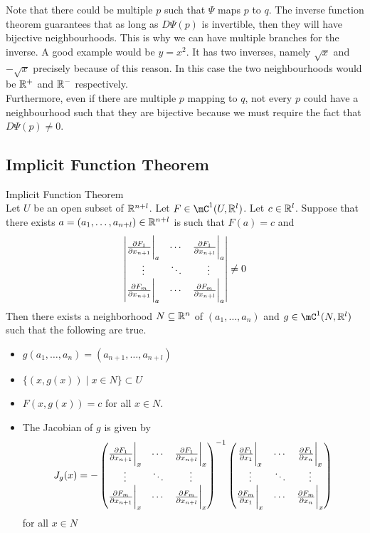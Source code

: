 \documentclass[a4paper]{article}
\begin{document}
Note that there could be multiple $p$ such that $\Psi$ maps $p$ to $q$. The inverse function theorem guarantees that as long as $D\Psi(p)$ is invertible, then they will have bijective neighbourhoods. This is why we can have multiple branches for the inverse. A good example would be $y=x^2$. It has two inverses, namely $\sqrt{x}$ and $-\sqrt{x}$ precisely because of this reason. In this case the two neighbourhoods would be $\mathbb{R}^+$ and $\mathbb{R}^-$ respectively. \\

Furthermore, even if there are multiple $p$ mapping to $q$, not every $p$ could have a neighbourhood such that they are bijective because we must require the fact that $D\Psi(p)\neq 0$. 

\subsection{Implicit Function Theorem}
\begin{thm}{Implicit Function Theorem}{}\\
Let $U$ be an open subset of $\mathbb{R}^{n+l}$. Let $F\in\mC^1(U,\R^l)$. Let $c\in\mathbb{R}^l$. Suppose that there exists $a=(a_1,\dots,a_{n+l})\in\mathbb{R}^{n+l}$ is such that $F(a)=c$ and $$\begin{vmatrix}
\frac{\partial F_1}{\partial x_{n+1}}\bigg{|}_a & \cdots & \frac{\partial F_1}{\partial x_{n+l}}\bigg{|}_a\\
\vdots & \ddots & \vdots\\
\frac{\partial F_m}{\partial x_{n+1}}\bigg{|}_a & \cdots & \frac{\partial F_m}{\partial x_{n+l}}\bigg{|}_a
\end{vmatrix}\neq 0$$ Then there exists a neighborhood $N\subseteq\mathbb{R}^n$ of $(a_1,\dots,a_n)$ and $g\in\mC^1(N,\R^l)$ such that the following are true. 
\begin{itemize}
\item $g(a_1,\dots,a_n)=(a_{n+1},\dots,a_{n+l})$
\item $\{(x,g(x))\;|\;x\in N\}\subset U$
\item $F(x,g(x))=c$ for all $x\in N$. 
\item The Jacobian of $g$ is given by $$J_g(x)=-\begin{pmatrix}
\frac{\partial F_1}{\partial x_{n+1}}\bigg{|}_x & \cdots & \frac{\partial F_1}{\partial x_{n+l}}\bigg{|}_x\\
\vdots & \ddots & \vdots\\
\frac{\partial F_m}{\partial x_{n+1}}\bigg{|}_x & \cdots & \frac{\partial F_m}{\partial x_{n+l}}\bigg{|}_x
\end{pmatrix}^{-1}\begin{pmatrix}
\frac{\partial F_1}{\partial x_1}\bigg{|}_x & \cdots & \frac{\partial F_1}{\partial x_n}\bigg{|}_x\\
\vdots & \ddots & \vdots\\
\frac{\partial F_m}{\partial x_1}\bigg{|}_x & \cdots & \frac{\partial F_m}{\partial x_n}\bigg{|}_x
\end{pmatrix}$$ for all $x\in N$
\end{itemize}
\end{thm}
\end{document}
